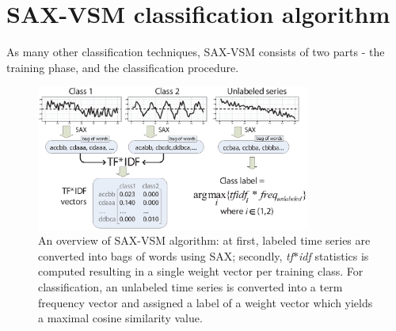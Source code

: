 \documentclass[conference]{IEEEtran}
\newcommand{\myfigureshrinker}{\vspace{0.05cm}}
\begin{document}

\section{SAX-VSM classification algorithm} \label{sax-vsm}
As many other classification techniques, SAX-VSM consists of two parts - the training
phase, and the classification procedure. 


\begin{figure}[t]
   \centering
   \myfigureshrinker
   \includegraphics[width=90mm]{figures/overview.eps}
   \caption{
   An overview of SAX-VSM algorithm: 
   at first, labeled time series are converted into bags of words using SAX; 
   secondly, \textit{tf$\ast$idf} statistics is computed resulting in 
   a single weight vector per training class. For classification, an unlabeled 
   time series is converted into a term frequency vector and assigned a 
   label of a weight vector which yields a maximal cosine similarity value.}
   \label{fig:overview}
\end{figure}
\end{document}
